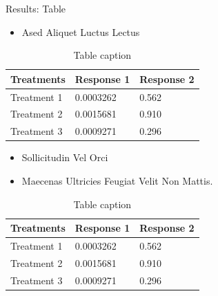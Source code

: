 \documentclass[final,hyperref={pdfpagelabels=false}]{beamer}
\begin{document}
\begin{frame}[t]
\begin{columns}[t]
\begin{column}{.465\textwidth}
            \begin{block}{Results: Table}

                \begin{itemize}
                    \item Ased Aliquet Luctus Lectus
                \end{itemize}

                \begin{table}
                    \begin{tabular}{l l l}
                        \toprule
                        \textbf{Treatments} & \textbf{Response 1} & \textbf{Response 2} \\
                        \midrule
                        Treatment 1         & 0.0003262           & 0.562               \\
                        Treatment 2         & 0.0015681           & 0.910               \\
                        Treatment 3         & 0.0009271           & 0.296               \\
                        \bottomrule
                    \end{tabular}
                    \caption{Table caption}
                \end{table}

                \begin{itemize}
                    \item Sollicitudin Vel Orci
                    \item Maecenas Ultricies Feugiat Velit Non Mattis.
                \end{itemize}

                \begin{table}
                    \begin{tabular}{l l l}
                        \toprule
                        \textbf{Treatments} & \textbf{Response 1} & \textbf{Response 2} \\
                        \midrule
                        Treatment 1         & 0.0003262           & 0.562               \\
                        Treatment 2         & 0.0015681           & 0.910               \\
                        Treatment 3         & 0.0009271           & 0.296               \\
                        \bottomrule
                    \end{tabular}
                    \caption{Table caption}
                \end{table}


\end{block}
\end{column}
\end{columns}
\end{frame}
\end{document}
